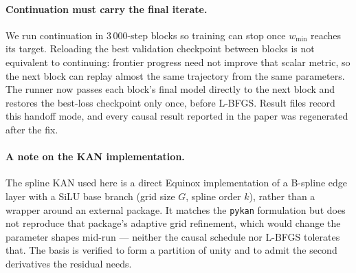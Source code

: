 \paragraph{Continuation must carry the final iterate.} We run continuation in
$3\,000$-step blocks so training can stop once $w_{\min}$ reaches its target.
Reloading the best validation checkpoint between blocks is not equivalent to
continuing: frontier progress need not improve that scalar metric, so the next
block can replay almost the same trajectory from the same parameters. The
runner now passes each block's final model directly to the next block and
restores the best-loss checkpoint only once, before L-BFGS. Result files record
this handoff mode, and every causal result reported in the paper was regenerated
after the fix.

\paragraph{A note on the KAN implementation.} The spline KAN used here is a
direct Equinox implementation of a B-spline edge layer with a SiLU base branch
(grid size $G$, spline order $k$), rather than a wrapper around an external
package. It matches the \verb|pykan| formulation but does not reproduce that
package's adaptive grid refinement, which would change the parameter shapes
mid-run --- neither the causal schedule nor L-BFGS tolerates that. The basis is
verified to form a partition of unity and to admit the second derivatives the
residual needs.
